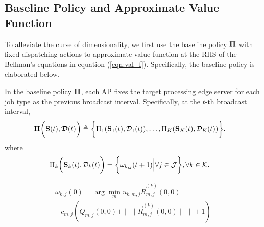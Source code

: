 \subsection{Baseline Policy and Approximate Value Function}
\label{subsec:baseline}
To alleviate the curse of dimensionality, we first use the baseline policy $\boldsymbol{\Pi}$ with fixed dispatching actions to approximate value function at the RHS of the Bellman's equations in equation (\ref{eqn:val_f}).
Specifically, the baseline policy is elaborated below.

\begin{definition}
    In the baseline policy $\boldsymbol{\Pi}$, each AP fixes the target processing edge server for each job type as the previous broadcast interval. Specifically, at the $t$-th broadcast interval,
    {\small
    \begin{align}
        \boldsymbol{\Pi}\bigg(\mathbf{S}(t),\boldsymbol{\mathcal{D}}(t)\bigg) &\triangleq \bigg\{ 
            \Pi_{1}(\mathbf{S}_{1}(t),\mathcal{D}_{1}(t)),
            \dots,
            \Pi_{K}(\mathbf{S}_{K}(t),\mathcal{D}_{K}(t))
        \bigg\},
    \end{align}
    }
    where
    \begin{align}
        \Pi_{k}\bigg(\mathbf{S}_{k}(t),\mathcal{D}_{k}(t)\bigg)
        &= \bigg\{
            {\omega}_{k,j}(t+1) \Big| \forall j\in\mathcal{J}
        \bigg\}, \forall k\in\mathcal{K}.
    \end{align}
\end{definition}

\begin{align}
    \omega_{k,j}(0) = \arg\min_{m} u_{k,m,j} \vec{R}^{(k)}_{m,j}(0, 0) 
    \\
    + c_{m,j} (Q_{m,j}(0,0) + \|\|\vec{R}^{(k)}_{m,j}(0, 0)\|\| + 1)
\end{align}

\begin{example}
\end{example}


